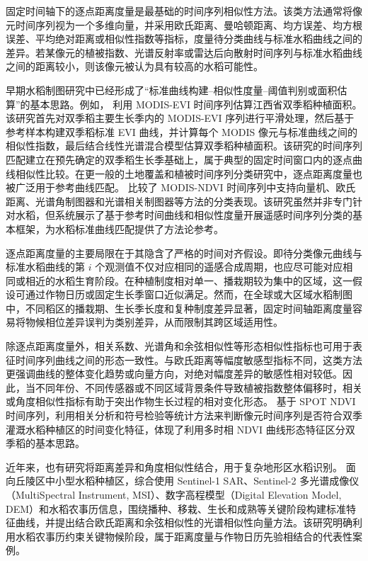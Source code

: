 固定时间轴下的逐点距离度量是最基础的时间序列相似性方法。该类方法通常将像元时间序列视为一个多维向量，并采用欧氏距离、曼哈顿距离、均方误差、均方根误差、平均绝对距离或相似性指数等指标，度量待分类曲线与标准水稻曲线之间的差异。若某像元的植被指数、光谱反射率或雷达后向散射时间序列与标准水稻曲线之间的距离较小，则该像元被认为具有较高的水稻可能性。

早期水稻制图研究中已经形成了“标准曲线构建--相似性度量--阈值判别或面积估算”的基本思路。例如，\citet{Jing2013TCSAE} 利用 MODIS-EVI 时间序列估算江西省双季稻种植面积。该研究首先对双季稻主要生长季内的 MODIS-EVI 序列进行平滑处理，然后基于参考样本构建双季稻标准 EVI 曲线，并计算每个 MODIS 像元与标准曲线之间的相似性指数，最后结合线性光谱混合模型估算双季稻种植面积。该研究的时间序列匹配建立在预先确定的双季稻生长季基础上，属于典型的固定时间窗口内的逐点曲线相似性比较。在更一般的土地覆盖和植被时间序列分类研究中，逐点距离度量也被广泛用于参考曲线匹配。\citet{Abade2015RemoteSensing} 比较了 MODIS-NDVI 时间序列中支持向量机、欧氏距离、光谱角制图器和光谱相关制图器等方法的分类表现。该研究虽然并非专门针对水稻，但系统展示了基于参考时间曲线和相似性度量开展遥感时间序列分类的基本框架，为水稻标准曲线匹配提供了方法论参考。

逐点距离度量的主要局限在于其隐含了严格的时间对齐假设。即待分类像元曲线与标准水稻曲线的第 $i$ 个观测值不仅对应相同的遥感合成周期，也应尽可能对应相同或相近的水稻生育阶段。在种植制度相对单一、播栽期较为集中的区域，这一假设可通过作物日历或固定生长季窗口近似满足。然而，在全球或大区域水稻制图中，不同稻区的播栽期、生长季长度和复种制度差异显著，固定时间轴距离度量容易将物候相位差异误判为类别差异，从而限制其跨区域适用性。

除逐点距离度量外，相关系数、光谱角和余弦相似性等形态相似性指标也可用于表征时间序列曲线之间的形态一致性。与欧氏距离等幅度敏感型指标不同，这类方法更强调曲线的整体变化趋势或向量方向，对绝对幅度差异的敏感性相对较低。因此，当不同年份、不同传感器或不同区域背景条件导致植被指数整体偏移时，相关或角度相似性指标有助于突出作物生长过程的相对变化形态。\citet{Chen2011JARS} 基于 SPOT NDVI 时间序列，利用相关分析和符号检验等统计方法来判断像元时间序列是否符合双季灌溉水稻种植区的时间变化特征，体现了利用多时相 NDVI 曲线形态特征区分双季稻的基本思路。

近年来，也有研究将距离差异和角度相似性结合，用于复杂地形区水稻识别。\citet{Wang2024PlantMethods} 面向丘陵区中小型水稻种植区，综合使用 Sentinel-1 SAR、Sentinel-2 多光谱成像仪（MultiSpectral Instrument, MSI）、数字高程模型（Digital Elevation Model, DEM）和水稻农事历信息，围绕播种、移栽、生长和成熟等关键阶段构建标准特征曲线，并提出结合欧氏距离和余弦相似性的光谱相似性向量方法。该研究明确利用水稻农事历约束关键物候阶段，属于距离度量与作物日历先验相结合的代表性案例。

